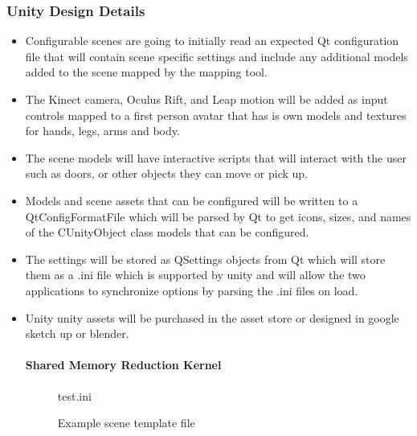 \documentclass[a4paper,10pt]{article}
\begin{document}
		\subsubsection{Unity Design Details}	
\begin{itemize}
	\item Configurable scenes are going to initially read an expected Qt configuration file that 
	will contain scene specific settings and include any additional models added to the scene mapped 
	by the mapping tool. 
	\item The Kinect camera, Oculus Rift, and Leap motion will be added as input controls mapped to a first person avatar that has is own models and textures for hands, legs, arms and body. 
	\item The scene models will have interactive scripts that will interact with the user such as doors, or other objects they can move or pick up. 
	\item Models and scene assets that can be configured will be written to a QtConfigFormatFile which will be parsed by Qt to get icons, sizes, and names of the CUnityObject class models that can be configured. 
	\item The settings will be stored as QSettings objects from Qt which will store them as a .ini file which is supported by unity and will allow the two applications to synchronize options by parsing the .ini files on load. 
	\item Unity unity assets will be purchased in the asset store or designed in google sketch up or blender. 
	
	\paragraph{Shared Memory Reduction Kernel}
\begin{figure}[H]
	\label{fig:sceneTemplate}
 {test.ini}
\caption{Example scene template file}
\end{figure}
\end{itemize}	
		\pagebreak
\end{document}
